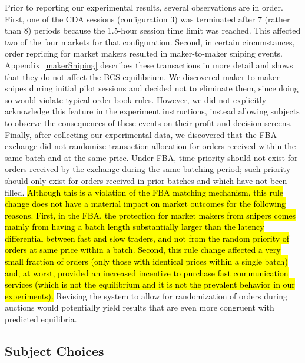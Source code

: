 \documentclass[12pt]{article}
\begin{document}
Prior to reporting our experimental results, several observations are in order. First, one of the CDA sessions (configuration 3) was terminated after 7 (rather than 8) periods because the 1.5-hour session time limit was reached. This affected two of the four markets for that configuration. Second, in certain circumstances, order repricing for market makers resulted in maker-to-maker sniping events. Appendix~\ref{makerSniping} describes these transactions in more detail and shows that they do not affect the BCS equilibrium. We discovered maker-to-maker snipes during initial pilot sessions and decided not to eliminate them, since doing so would violate typical order book rules. However, we did not explicitly acknowledge this feature in the experiment instructions, instead allowing subjects to observe the consequences of these events on their profit and decision screens. Finally, after collecting our experimental data, we discovered that the FBA exchange did not randomize transaction allocation for orders received within the same batch and at the same price. 
Under FBA, time priority should not exist for orders received by the exchange during the same batching period; such priority should only exist for orders received in prior batches and which have not been filled. 
\hl{Although this is a violation of the FBA matching mechanism, this rule change does not have a material impact on market outcomes for the following reasons. First, in the FBA, the protection for market makers from snipers comes mainly from having a batch length substantially larger than the latency differential between fast and slow traders, and not from the random priority of orders at same price within a batch. Second, this rule change affected a very small fraction of orders (only those with identical prices within a single batch) and, at worst, provided an increased incentive to purchase fast communication services (which is not the equilibrium and it is not the prevalent behavior in our experiments).}
Revising the system to allow for randomization of orders during auctions would potentially yield results that are even more congruent with predicted equilibria.

\subsection{Subject Choices}
\end{document}
